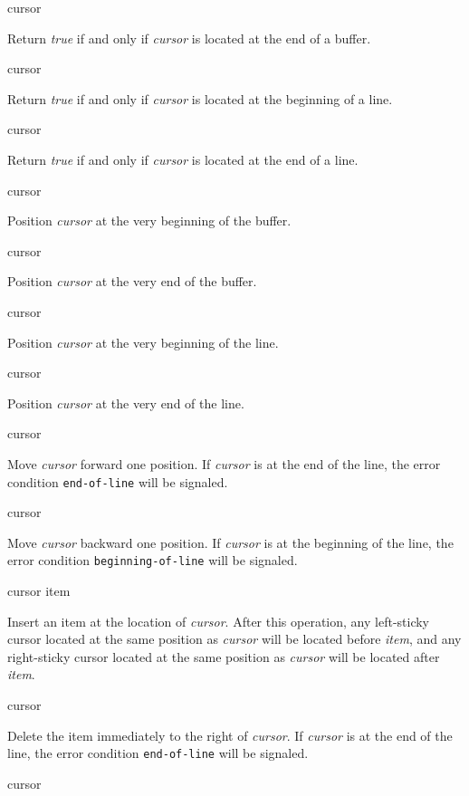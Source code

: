  {cursor}

Return \textit{true} if and only if \textit{cursor} is located at the
end of a buffer.

 {cursor}

Return \textit{true} if and only if \textit{cursor} is located at the
beginning of a line.

 {cursor}

Return \textit{true} if and only if \textit{cursor} is located at the
end of a line.

 {cursor}

Position \textit{cursor} at the very beginning of the buffer.

 {cursor}

Position \textit{cursor} at the very end of the buffer.

 {cursor}

Position \textit{cursor} at the very beginning of the line.

 {cursor}

Position \textit{cursor} at the very end of the line.

 {cursor}

Move \textit{cursor} forward one position.  If \emph{cursor} is at the
end of the line, the error condition \texttt{end-of-line} will be
signaled.

 {cursor}

Move \textit{cursor} backward one position.  If \emph{cursor} is at
the beginning of the line, the error condition
\texttt{beginning-of-line} will be signaled.

 {cursor item}

Insert an item at the location of \textit{cursor}.  After this
operation, any left-sticky cursor located at the same position as
\textit{cursor} will be located before \textit{item}, and any
right-sticky cursor located at the same position as \textit{cursor}
will be located after \textit{item}.

 {cursor}

Delete the item immediately to the right of \emph{cursor}.  If
\emph{cursor} is at the end of the line, the error condition
\texttt{end-of-line} will be signaled.

 {cursor}

